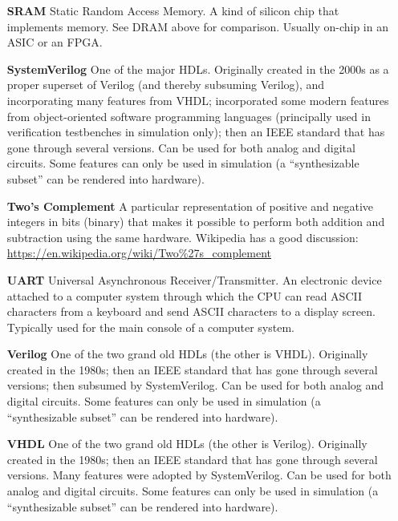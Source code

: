 \begin{itemize}
\item[\bf SRAM] Static Random Access Memory.  A kind of silicon chip
  that implements memory.  See DRAM above for comparison.  Usually
  on-chip in an ASIC or an FPGA.

\item[\bf SystemVerilog] One of the major HDLs.  Originally created in
  the 2000s as a proper superset of Verilog (and thereby subsuming
  Verilog), and incorporating many features from VHDL; incorporated
  some modern features from object-oriented software programming
  languages (principally used in verification testbenches in
  simulation only); then an IEEE standard that has gone through
  several versions.  Can be used for both analog and digital circuits.
  Some features can only be used in simulation (a ``synthesizable
  subset'' can be rendered into hardware).

\item[\bf Two's Complement] A particular representation of positive
  and negative integers in bits (binary) that makes it possible to
  perform both addition and subtraction using the same
  hardware. Wikipedia has a good discussion:
  \url{https://en.wikipedia.org/wiki/Two%27s_complement}


\item[\bf UART] Universal Asynchronous Receiver/Transmitter.  An
  electronic device attached to a computer system through which the
  CPU can read ASCII characters from a keyboard and send ASCII
  characters to a display screen.  Typically used for the main console
  of a computer system.

\item[\bf Verilog] One of the two grand old HDLs (the other is VHDL).
  Originally created in the 1980s; then an IEEE standard that has gone
  through several versions; then subsumed by SystemVerilog.  Can be
  used for both analog and digital circuits.  Some features can only
  be used in simulation (a ``synthesizable subset'' can be rendered
  into hardware).

\item[\bf VHDL] One of the two grand old HDLs (the other is Verilog).
  Originally created in the 1980s; then an IEEE standard that has gone
  through several versions. Many features were adopted by
  SystemVerilog.  Can be used for both analog and digital circuits.
  Some features can only be used in simulation (a ``synthesizable
  subset'' can be rendered into hardware).

\end{itemize}

